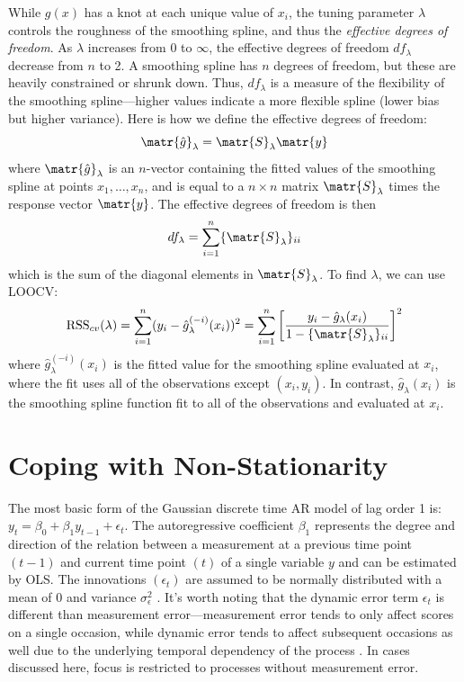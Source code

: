 While $g(x)$ has a knot at each unique value of $x_i$, the tuning parameter $\lambda$ controls the roughness of the smoothing spline, and thus the \textit{effective degrees of freedom}. As $\lambda$ increases from $0$ to $\infty$, the effective degrees of freedom $df_{\lambda}$ decrease from $n$ to 2. A smoothing spline has $n$ degrees of freedom, but these are heavily constrained or shrunk down. Thus, $df_{\lambda}$ is a measure of the flexibility of the smoothing spline---higher values indicate a more flexible spline (lower bias but higher variance). Here is how we define the effective degrees of freedom:
\begin{equation}
    \matr{\hat{g}}_{\lambda} = \matr{S}_{\lambda} \matr{y}
\end{equation}
where $\matr{\hat{g}}_{\lambda}$ is an $n$-vector containing the fitted values of the smoothing spline at points $x_1,\dots,x_n$, and is equal to a $n \times n$ matrix $\matr{S}_{\lambda}$ times the response vector $\matr{y}$. The effective degrees of freedom is then
\begin{equation}
    df_{\lambda} = \sum_{i=1}^n \{ \matr{S}_{\lambda} \}_{ii}
\end{equation}
which is the sum of the diagonal elements in $\matr{S}_{\lambda}$. To find $\lambda$, we can use LOOCV:
\begin{equation}
    \text{RSS}_{cv}(\lambda) = \sum_{i=1}^n (y_i - \hat{g}_{\lambda}^{(-i)} (x_i))^2 = \sum_{i=1}^n \left[ \frac{y_i - \hat{g}_{\lambda} (x_i)}{1 - \{\matr{S}_{\lambda}\}_{ii}} \right]^2
\end{equation}
where $\hat{g}_{\lambda}^{(-i)}(x_i)$ is the fitted value for the smoothing spline evaluated at $x_i$, where the fit uses all of the observations except $(x_i, y_i)$. In contrast, $\hat{g}_{\lambda}(x_i)$ is the smoothing spline function fit to all of the observations and evaluated at $x_i$. 

\section{Coping with Non-Stationarity}
The most basic form of the Gaussian discrete time AR model of lag order 1 is: $y_t = \beta_0 + \beta_1 y_{t-1} + \epsilon_t$. The autoregressive coefficient $\beta_1$ represents the degree and direction of the relation between a measurement at a previous time point $(t-1)$ and current time point $(t)$ of a single variable $y$ and can be estimated by OLS. The innovations $(\epsilon_t)$ are assumed to be normally distributed with a mean of 0 and variance $\sigma_{\epsilon}^2$ \cite{hamilton1994time}. It's worth noting that the dynamic error term $\epsilon_t$ is different than measurement error---measurement error tends to only affect scores on a single occasion, while dynamic error tends to affect subsequent occasions as well due to the underlying temporal dependency of the process \cite{schuurman2015incorporating}. In cases discussed here, focus is restricted to processes without measurement error.

